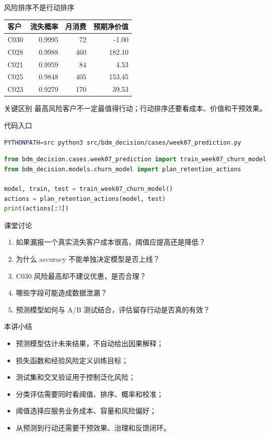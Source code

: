 \documentclass[UTF8,fontset=fandol,aspectratio=169,11pt]{ctexbeamer}
\begin{document}
\begin{frame}{风险排序不是行动排序}
\begin{center}
\begin{tabular}{lrrr}
\toprule
客户 & 流失概率 & 月消费 & 预期净价值\\
\midrule
C030 & 0.9995 & 72 & -1.00\\
C028 & 0.9988 & 460 & 182.10\\
C021 & 0.9959 & 84 & 4.53\\
C025 & 0.9848 & 405 & 153.45\\
C023 & 0.9279 & 170 & 39.53\\
\bottomrule
\end{tabular}
\end{center}
\begin{block}{关键区别}
最高风险客户不一定最值得行动；行动排序还要看成本、价值和干预效果。
\end{block}
\end{frame}

\begin{frame}[fragile]{代码入口}
\begin{lstlisting}[language=bash]
PYTHONPATH=src python3 src/bdm_decision/cases/week07_prediction.py
\end{lstlisting}

\begin{lstlisting}[language=Python]
from bdm_decision.cases.week07_prediction import train_week07_churn_model
from bdm_decision.models.churn_model import plan_retention_actions

model, train, test = train_week07_churn_model()
actions = plan_retention_actions(model, test)
print(actions[:3])
\end{lstlisting}
\end{frame}

\begin{frame}{课堂讨论}
\begin{enumerate}
  \item 如果漏报一个真实流失客户成本很高，阈值应提高还是降低？
  \item 为什么 accuracy 不能单独决定模型是否上线？
  \item C030 风险最高却不建议优惠，是否合理？
  \item 哪些字段可能造成数据泄漏？
  \item 预测模型如何与 A/B 测试结合，评估留存行动是否真的有效？
\end{enumerate}
\end{frame}

\begin{frame}{本讲小结}
\begin{itemize}
  \item 预测模型估计未来结果，不自动给出因果解释；
  \item 损失函数和经验风险定义训练目标；
  \item 测试集和交叉验证用于控制泛化风险；
  \item 分类评估需要同时看阈值、排序、概率和校准；
  \item 阈值选择应服务业务成本、容量和风险偏好；
  \item 从预测到行动还需要干预效果、治理和反馈闭环。
\end{itemize}
\end{frame}
\end{document}
